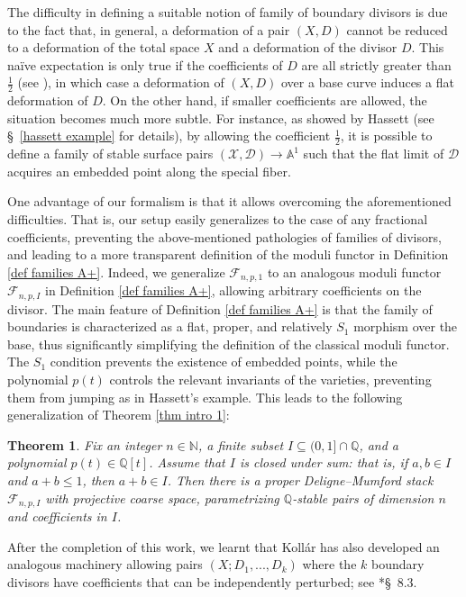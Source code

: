 \documentclass{amsart}
\newcommand{\bQ}{\mathbb{Q}}
\newcommand{\sF}{\mathscr{F}}
\newtheorem{theorem}{Theorem}[section]
\theoremstyle{definition}
\newcommand{\rar}{\rightarrow}
\begin{document}
The difficulty in defining a suitable notion of family of boundary divisors is due to the fact that, in general, a deformation of a pair $(X,D)$ cannot be reduced to a deformation of the total space $X$ and a deformation of the divisor $D$.
This na\"ive expectation is only true if the coefficients of $D$ are all strictly greater than $\frac{1}{2}$ (see \cite{Kol14}), in which case a deformation of $(X,D)$ over a base curve induces a flat deformation of $D$.
On the other hand, if smaller coefficients are allowed, the situation becomes much more subtle.
For instance, as showed by Hassett (see \S~\ref{hassett example} for details), by allowing the coefficient $\frac{1}{2}$, it is possible to define a family of stable surface pairs $(\mathcal{X},\mathcal{D}) \rar \mathbb A ^1$ such that the flat limit of $\mathcal{D}$ acquires an embedded point along the special fiber.

One advantage of our formalism is that it allows overcoming the aforementioned difficulties.
That is, our setup easily generalizes to the case of any fractional coefficients, preventing the above-mentioned pathologies of families of divisors, and leading to a more transparent definition of the moduli functor in Definition \ref{def families A+}.
Indeed, we generalize $\sF_{n,p,1}$ to an analogous moduli functor $\sF_{n,p,I}$ in Definition \ref{def families A+}, allowing arbitrary coefficients on the divisor.
The main feature of Definition \ref{def families A+} is that the family of boundaries is characterized as a flat, proper, and relatively $S_1$ morphism over the base, thus significantly simplifying the definition of the classical moduli functor.
The $S_1$ condition prevents the existence of embedded points, while the polynomial $p(t)$ controls the relevant invariants of the varieties, preventing them from jumping as in Hassett's example. This leads to the following generalization of Theorem \ref{thm intro 1}:

\begin{theorem} \label{thm intro 1 on steroids}
Fix an integer $n\in \mathbb{N}$, a finite subset $I\subseteq (0,1] \cap \mathbb{Q}$, and a polynomial $p(t) \in \mathbb{Q}[t]$.
Assume that $I$ is closed under sum: that is, if $a,b \in I$ and $a+b \leq 1$, then $a+b \in I$.
Then there is a proper Deligne--Mumford stack $\sF_{n,p,I}$ with projective coarse space, parametrizing $\bQ$-stable pairs of dimension $n$ and coefficients in $I$.
\end{theorem}

After the completion of this work, we learnt that Koll\'ar has also developed an analogous machinery allowing pairs $(X;D_1,...,D_k)$ where the $k$ boundary divisors have coefficients that can be independently perturbed; see \cite{kol_new}*{\S~8.3}.
\end{document}
